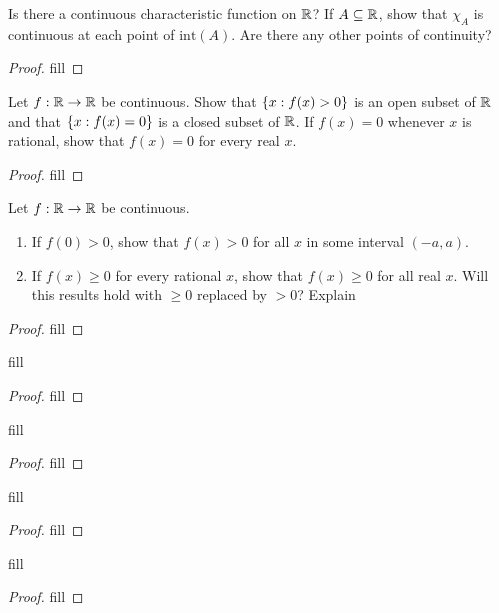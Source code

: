 \begin{exercise}{5}
Is there a continuous characteristic function on $\mathbb{R}$?
If $A\subseteq\mathbb{R}$, show that $\chi_A$ is continuous at each point of $\text{int}(A)$.
Are there any other points of continuity?
\end{exercise}
\begin{proof}
fill
\end{proof} 

\begin{exercise}{6}
Let $f:\mathbb{R}\to\mathbb{R}$ be continuous.
Show that $\{x:f(x)>0\}$ is an open subset of $\mathbb{R}$ and that $\{x:f(x)=0\}$ is a closed subset of $\mathbb{R}$.
If $f(x)=0$ whenever $x$ is rational, show that $f(x)=0$ for every real $x$.
\end{exercise}
\begin{proof}
fill
\end{proof} 

\begin{exercise}{8}
Let $f:\mathbb{R}\to\mathbb{R}$ be continuous.
\begin{enumerate}
    \item If $f(0)>0$, show that $f(x)>0$ for all $x$ in some interval $(-a,a)$.
    \item If $f(x)\geq 0$ for every rational $x$, show that $f(x)\geq 0$ for all real $x$.
    Will this results hold with $\geq0$ replaced by $>0$? 
    Explain
\end{enumerate}
\end{exercise}
\begin{proof}
fill
\end{proof} 

\begin{exercise}{9}
fill
\end{exercise}
\begin{proof}
fill
\end{proof} 

\begin{exercise}{10}
fill
\end{exercise}
\begin{proof}
fill
\end{proof} 

\begin{exercise}{14}
fill
\end{exercise}
\begin{proof}
fill
\end{proof} 

\begin{exercise}{17}
fill
\end{exercise}
\begin{proof}
fill
\end{proof} 

